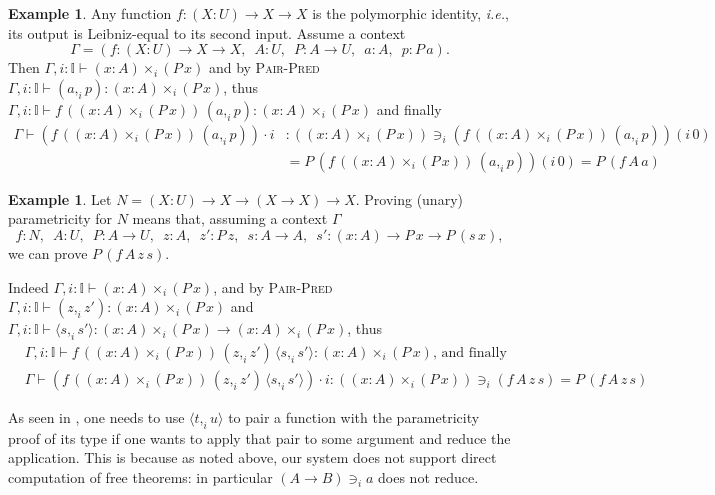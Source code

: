 \documentclass[english]{PaperTools/latex/entcs}
\theoremstyle{plain}
\theoremstyle{definition}
\newtheorem{example}[theorem]{Example}
\theoremstyle{remark}
\newcommand\CP[3]{(#2,_{#1} #3)}
\newcommand\CTimes[2]{(#2) ×_{#1}}
\newcommand\param[1]{\!\cdot\!#1}
\newcommand\op[1]{∋_{#1}}
\newcommand\fp[3]{⟨#2 ,_{#1} #3⟩}
\newcommand\mor[2]{({#1}\,{#2})}
\newcommand\proj[2]{{#2}\mor{#1}0}
\def\ie{\textit{i.e.}}
\begin{document}
\begin{example}
  \label{ex:poly-id}
  Any function $f : (X : U) → X → X$ is the polymorphic identity, \ie,
  its output is Leibniz-equal to its second input. Assume a
  context\\[-.75\baselineskip]%
  $$Γ = (f : (X : U) → X → X,\enspace
    A : U,\enspace
    P : A → U,\enspace
    a : A,\enspace
    p : P\, a).$$
  Then
  $Γ, i:𝕀⊢\CTimes i {x:A} {(P\,x)}$
  and by \textsc{Pair-Pred}
  $Γ, i:𝕀⊢\CP i a p : \CTimes i {x:A} {(P\,x)}$, thus
  $Γ, i:𝕀⊢f\, (\CTimes i {x:A} {(P\,x)})\, {\CP i a p} : \CTimes i {x:A} {(P\,x)}$
  and finally\\[-1.5\baselineskip]%
  \begin{align*}
   Γ ⊢(f\, (\CTimes i {x:A} {(P\,x)})\, {\CP i a p}) \param i
   &: (\CTimes i {x:A} {(P\,x)}) \op i \proj i {(f\, (\CTimes i {x:A} {(P\,x)})\, {\CP i a p})} \\
   &= P\, \proj i {(f\, (\CTimes i {x:A} {(P\,x)})\, {\CP i a p})}
    = P\, (f\, A\, a)
  \end{align*}
\end{example}

\begin{example}
  \label{ex:church-nat}
Let $N = (X : U) → X → (X → X) → X$.
Proving (unary) parametricity for $N$ means that, assuming a context $Γ$\\[-.75\baselineskip]%
  $$f : N,\enspace
    A : U,\enspace
    P : A → U,\enspace
    z : A,\enspace
    z' : P\, z,\enspace
    s : A → A,\enspace
    s' : (x:A) → P\, x → P\, (s\, x),$$
we can prove $P\, (f\, A\, z\, s)$.

Indeed
  $Γ, i:𝕀⊢\CTimes i {x:A} {(P\,x)}$,
  and by \textsc{Pair-Pred}
  $Γ, i:𝕀⊢ \CP i z {z'} : \CTimes i {x:A} {(P\,x)}$ and
  $Γ, i:𝕀⊢ \fp i s {s'} : \CTimes i {x:A} {(P\,x)} → \CTimes i {x:A} {(P\,x)}$,
thus\\[-1.5\baselineskip]
  \begin{align*}
    &Γ, i:𝕀 ⊢ f\, (\CTimes i {x:A} {(P\,x)})\, {\CP i z {z'}}\, \fp i s {s'} : \CTimes i {x:A} {(P\,x)}\text{, and finally}\\
    &Γ ⊢ (f\, (\CTimes i {x:A} {(P\,x)})\, {\CP i z {z'}}\, \fp i s {s'}) \param i
       : (\CTimes i {x:A} {(P\,x)}) \op i (f\, A\, z\, s)
       = P\, (f\, A\, z\, s)
  \end{align*}
\end{example}

As seen in , one needs to use
$\fp i t u$ to pair a function with the parametricity proof of its type
if one wants to apply that pair to some argument and reduce the
application.  This is because as noted above, our system does not
support direct computation of free theorems: in particular $(A → B) \op i a$
does not reduce.
\end{document}
